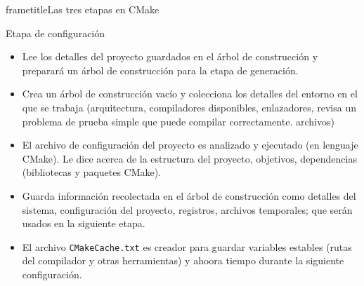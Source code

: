 \begin{frame}
	frametitle{Las tres etapas en CMake}
	
	\begin{block}{Etapa de configuración}
		\begin{itemize}
			\item

			Lee los detalles del proyecto guardados en el árbol de construcción
			y preparará un árbol de construcción para la etapa de generación.
			
			\item

			Crea un árbol de construcción vacío y colecciona los detalles del entorno
			en el que se trabaja (arquitectura, compiladores disponibles, enlazadores,
			revisa un problema de prueba simple que puede compilar correctamente.
			archivos)
			
			
						\item

El archivo de configuración del proyecto es analizado y ejecutado (en lenguaje CMake).
Le dice acerca de la estructura del proyecto, objetivos, dependencias (bibliotecas y paquetes CMake).
			
						\item
			
						Guarda información recolectada en el árbol de construcción
						como detalles del sistema, configuración del proyecto, registros,
						archivos temporales; que serán usados en la siguiente etapa.

						\item

						El archivo \lstinline{CMakeCache.txt} es creador para guardar
						variables estables (rutas del compilador y otras herramientas)
						y ahoora tiempo durante la siguiente configuración.
					\end{itemize}
	\end{block}
\end{frame}


